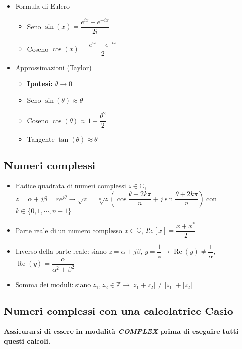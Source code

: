 \documentclass{article}
\begin{document}
\begin{itemize}
\begin{itemize}
	\end{itemize}
	\item Formula di Eulero
	\begin{itemize}
		\item Seno \(\sin(x) = \dfrac{e^{ix} + e^{-ix}}{2i} \)
		\item Coseno \(\cos(x) = \dfrac{e^{ix} - e^{-ix}}{2} \)
	\end{itemize}
	\item Approssimazioni (Taylor)
	\begin{itemize}
		\item \textbf{Ipotesi:} \( \theta \rightarrow 0 \)
		\item Seno \( \sin(\theta) \approx \theta \)
		\item Coseno \( \cos(\theta) \approx 1 - \dfrac{\theta^2}{2} \)
		\item Tangente \( \tan(\theta) \approx \theta\)
	\end{itemize}
\end{itemize}

\subsection{Numeri complessi}
\begin{itemize}
	\item Radice quadrata di numeri complessi \(z \in \mathbb{C}\), \\ \( z = \alpha + j \beta = r e^{j \theta} \rightarrow \sqrt{z} = \sqrt[n]{z} \left( \cos{\dfrac{\theta + 2k\pi}{n}} + j \sin{\dfrac{\theta + 2 k \pi}{n}} \right) \) \newline con \(k \in \{0, 1, \cdots, n-1 \} \)
	\item Parte reale di un numero complesso \(x \in \mathbb{C}\), \(Re[x] = \dfrac{x + x^{*}}{2} \)
	\item Inverso della parte reale: siano \(z = \alpha + j \beta \), \(y = \dfrac{1}{z} \rightarrow \operatorname{Re}(y) \neq \dfrac{1}{\alpha}\), \(\operatorname{Re}(y)  = \dfrac{\alpha}{\alpha^2 + \beta^2}\)
	\item Somma dei moduli: siano \(z_1, z_2 \in \mathbb{Z} \rightarrow |z_1 + z_2| \neq |z_1| + |z_2| \)
\end{itemize}

\subsection{Numeri complessi con una calcolatrice Casio}
\textbf{Assicurarsi di essere in modalità \textit{COMPLEX} prima di eseguire tutti questi calcoli.}
\end{document}
